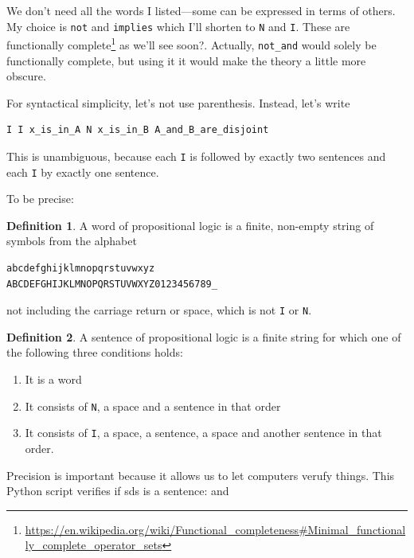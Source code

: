 \documentclass[11pt,oneside,%
]{memoir}
\theoremstyle{definition}
\newtheorem{maaritelma}{Definition}
\begin{document}
We don't need all the words I listed---some can be expressed in terms of others. My choice is \lstinline!not! and \lstinline!implies! which I'll shorten to \lstinline[language=propositio]!N! and \lstinline[language=propositio]!I!. These are functionally complete\footnote{\url{https://en.wikipedia.org/wiki/Functional_completeness\#Minimal_functionally_complete_operator_sets}} as we'll see soon?. Actually, \lstinline!not_and! would solely be functionally complete, but using it it would make the theory a little more obscure.

For syntactical simplicity, let's not use parenthesis. Instead, let's write
\begin{lstlisting}[language=propositio]
I I x_is_in_A N x_is_in_B A_and_B_are_disjoint
\end{lstlisting}
This is unambiguous, because each \lstinline[language=propositio]!I! is followed by exactly two sentences and each \lstinline[language=propositio]!I! by exactly one sentence.

To be precise:
\begin{maaritelma}
A word of propositional logic is a finite, non-empty string of symbols from the alphabet
\begin{lstlisting}
abcdefghijklmnopqrstuvwxyz
ABCDEFGHIJKLMNOPQRSTUVWXYZ0123456789_
\end{lstlisting}
not including the carriage return or space, which is not \lstinline[language=propositio]!I! or \lstinline[language=propositio]!N!.
\end{maaritelma}%
\begin{maaritelma}
A sentence of propositional logic is a finite string for which one of the following three conditions holds:
\begin{enumerate}
    \item It is a word
    \item It consists of \lstinline[language=propositio]!N!, a space and a sentence in that order
    \item It consists of \lstinline[language=propositio]!I!, a space, a sentence, a space and another sentence in that order.
\end{enumerate}
\end{maaritelma}
Precision is important because it allows us to let computers verufy things. This Python script verifies if sds is a sentence:
and 


\end{document}
